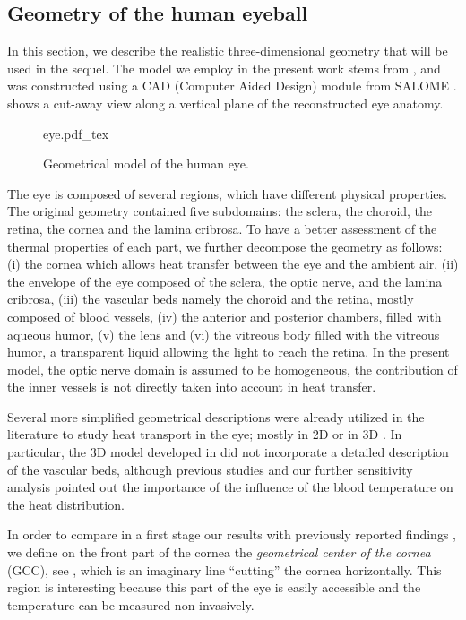 \subsection{Geometry of the human eyeball}
\label{sec:model-geo}


In this section, we describe the realistic three-dimensional geometry that will be used in the sequel.
The model we employ in the present work stems from \cite{https://doi.org/10.1002/cnm.3791},
and was constructed using a CAD (Computer Aided Design) module from SALOME \cite{salome}.
 shows a cut-away view along a vertical plane of the reconstructed eye anatomy.


\begin{figure}
    \centering

    \def\svgwidth{0.5\columnwidth}
    {eye.pdf_tex}
    \caption{Geometrical model of the human eye.}
    \label{fig:geo-eye}
\end{figure}


The eye is composed of several regions, which have different physical properties.
The original geometry contained five subdomains: the sclera, the choroid, the retina, the cornea and the lamina cribrosa.
To have a better assessment of the thermal properties of each part, we further decompose the geometry as follows:
(i) the cornea which allows heat transfer between the eye and the ambient air,
(ii) the envelope of the eye composed of the sclera, the optic nerve, and the lamina cribrosa,
(iii) the vascular beds namely the choroid and the retina, mostly composed of blood vessels,
(iv) the anterior and posterior chambers, filled with aqueous humor,
(v) the lens and
(vi) the vitreous body filled with the vitreous humor, a transparent liquid allowing the light to reach the retina.
In the present model, the optic nerve domain is assumed to be homogeneous, the contribution of the inner vessels is not directly taken into account in heat transfer.


Several more simplified geometrical descriptions were already utilized in the literature to study heat transport in the eye;
mostly in 2D \cite{Scott_1988,NG2006268} or in 3D \cite{NG2007829,li2010}.
In particular, the 3D model developed in \cite{NG2007829} did not incorporate a detailed description of the vascular beds, although previous studies \cite{Scott_1988} and our further sensitivity analysis pointed out the importance of the influence of the blood temperature on the heat distribution.

In order to compare in a first stage our results with previously reported findings \cite{Efron1989OcularST},
we define on the front part of the cornea the \emph{geometrical center of the cornea} (GCC), see , which is an imaginary line ``cutting'' the cornea horizontally.
This region is interesting because this part of the eye is easily accessible and the temperature can be measured non-invasively.
